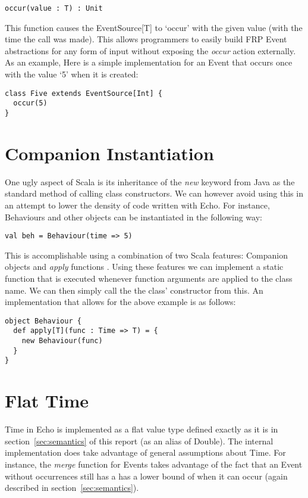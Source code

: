 \begin{verbatim}
occur(value : T) : Unit
\end{verbatim}  

    This function causes the EventSource[T] to `occur' with the given value (with the time the call was made). This allows 
    programmers
    to easily build FRP Event abstractions for any form of input without exposing the \emph{occur} action externally.
    As an example, Here is a simple implementation for an Event that occurs once with the value `5' when it 
    is created:
    
\begin{verbatim}
class Five extends EventSource[Int] {
  occur(5)
}
\end{verbatim}

  \section{Companion Instantiation}
    One ugly aspect of Scala is its inheritance of the \emph{new} keyword from Java as the standard
    method of calling class constructors.
    We can however avoid using this in an attempt to lower the density of code written with Echo. For instance, Behaviours and other objects can be instantiated in the following way:

\begin{verbatim}
val beh = Behaviour(time => 5)
\end{verbatim}

    This is accomplishable using a combination of two Scala features: Companion objects and \emph{apply} functions
    \cite{Typesafe}. Using these features we can implement a static function that is executed whenever function
    arguments are applied to the class name. We can then simply call the the class' constructor from this. An implementation
    that allows for the above example is as follows:

\begin{verbatim}
object Behaviour {
  def apply[T](func : Time => T) = {
    new Behaviour(func)
  }
}
\end{verbatim}    
    
  \section{Flat Time}
    Time in Echo is implemented as a flat value type defined exactly as it is in 
    section~\ref{sec:semantics} of this report (as an alias of Double). The internal implementation does take advantage
    of general assumptions about Time. For instance, the \emph{merge} function for Events takes advantage
    of the fact that an Event without occurrences still has a has a lower bound of when it can occur (again described
    in section~\ref{sec:semantics}). 
    
